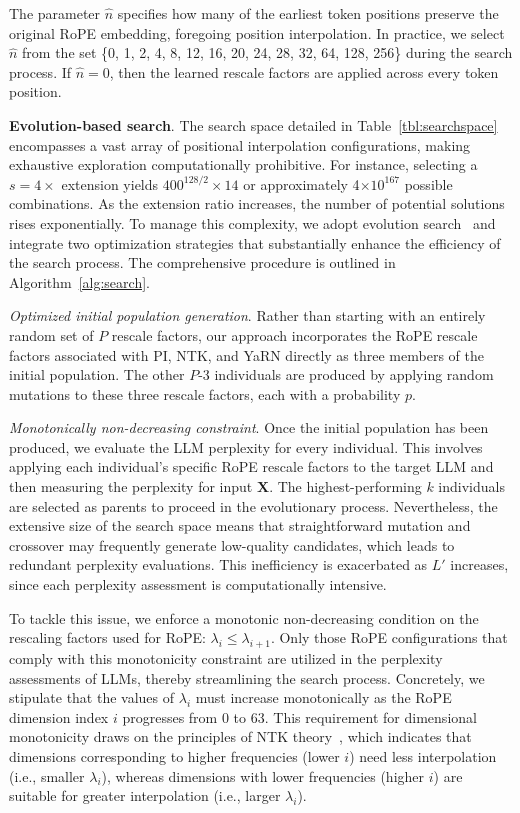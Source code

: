 The parameter $\hat{n}$ specifies how many of the earliest token positions preserve the original RoPE embedding, foregoing position interpolation. In practice, we select $\hat{n}$ from the set \{0, 1, 2, 4, 8, 12, 16, 20, 24, 28, 32, 64, 128, 256\} during the search process. If $\hat{n}=0$, then the learned rescale factors are applied across every token position.

\textbf{Evolution-based search}. The search space detailed in Table~\ref{tbl:searchspace} encompasses a vast array of positional interpolation configurations, making exhaustive exploration computationally prohibitive. For instance, selecting a $s=4\times$ extension yields $400^{128/2}\times14$ or approximately 4$\times10^{167}$ possible combinations. As the extension ratio increases, the number of potential solutions rises exponentially. To manage this complexity, we adopt evolution search~\cite{guo2020single} and integrate two optimization strategies that substantially enhance the efficiency of the search process. The comprehensive procedure is outlined in Algorithm~\ref{alg:search}.

\textit{Optimized initial population generation}. Rather than starting with an entirely random set of $P$ rescale factors, our approach incorporates the RoPE rescale factors associated with PI, NTK, and YaRN directly as three members of the initial population. The other $P$-3 individuals are produced by applying random mutations to these three rescale factors, each with a probability $p$.

\textit{Monotonically non-decreasing constraint}. Once the initial population has been produced, we evaluate the LLM perplexity for every individual. This involves applying each individual's specific RoPE rescale factors to the target LLM and then measuring the perplexity for input $\mathbf{X}$. The highest-performing $k$ individuals are selected as parents to proceed in the evolutionary process. Nevertheless, the extensive size of the search space means that straightforward mutation and crossover may frequently generate low-quality candidates, which leads to redundant perplexity evaluations. This inefficiency is exacerbated as $L'$ increases, since each perplexity assessment is computationally intensive.

To tackle this issue, we enforce a monotonic non-decreasing condition on the rescaling factors used for RoPE: $\lambda_i\le \lambda_{i+1}$. Only those RoPE configurations that comply with this monotonicity constraint are utilized in the perplexity assessments of LLMs, thereby streamlining the search process. Concretely, we stipulate that the values of $\lambda_i$ must increase monotonically as the RoPE dimension index $i$ progresses from $0$ to $63$. This requirement for dimensional monotonicity draws on the principles of NTK theory~\cite{jacot2018neural,tancik2020fourier,ntk}, which indicates that dimensions corresponding to higher frequencies (lower $i$) need less interpolation (i.e., smaller $\lambda_i$), whereas dimensions with lower frequencies (higher $i$) are suitable for greater interpolation (i.e., larger $\lambda_i$).

